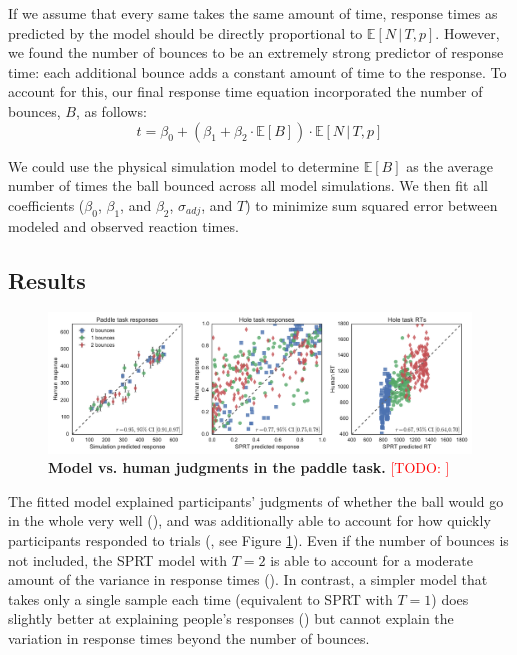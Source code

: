 \documentclass[10pt,letterpaper]{article}
\newcommand{\TODO}[1]{\textcolor{red}{[TODO: #1]}}
\begin{document}
If we assume that every same takes the same amount of time, response times as predicted by the model should be directly proportional to $\mathbb{E}[N\,|\,T,p]$. However, we found the number of bounces to be an extremely strong predictor of response time: each additional bounce adds a constant amount of time to the response. To account for this, our final response time equation incorporated the number of bounces, $B$, as follows:
\begin{equation}
t = \beta_0 + (\beta_1 + \beta_2\cdot{}\mathbb{E}[B]) \cdot{}\mathbb{E}[N\,|\,T,p]
\label{eq:rt}
\end{equation}

We could use the physical simulation model to determine $\mathbb{E}[B]$ as the average number of times the ball bounced across all model simulations. We then fit all coefficients ($\beta_0$, $\beta_1$, and $\beta_2$, $\sigma_{adj}$, and $T$) to minimize sum squared error between modeled and observed reaction times.

\subsection{Results}

\begin{figure}[t]
    \begin{center}
        \includegraphics[width=\textwidth]{figures/model_results.pdf}
        \caption{\textbf{Model vs. human judgments in the paddle task.} \TODO{}}
        \label{fig:model-results}
    \end{center}
\end{figure}

The fitted model explained participants' judgments of whether the ball would go in the whole very well (\HoleResponseCorr{}), and was additionally able to account for how quickly participants responded to trials (\HoleRTCorr{}, see Figure \ref{fig:model-results}). Even if the number of bounces is not included, the SPRT model with $T=2$ is able to account for a moderate amount of the variance in response times (\NoBouncesHoleRTCorr{}). In contrast, a simpler model that takes only a single sample each time (equivalent to SPRT with $T=1$) does slightly better at explaining people's responses (\RawHoleResponseCorr{}) but cannot explain the variation in response times beyond the number of bounces.
\end{document}
